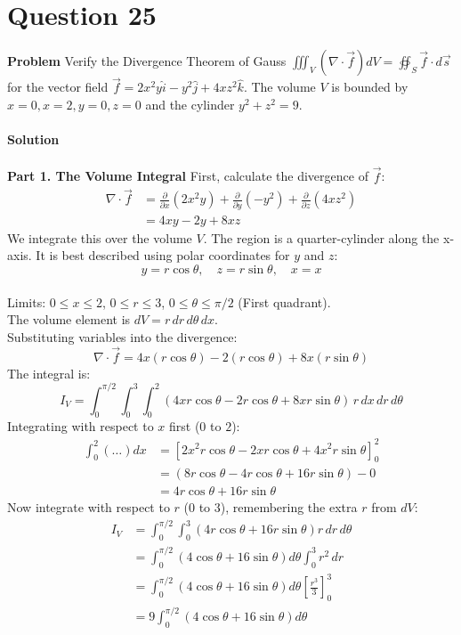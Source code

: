 \documentclass{article}
\begin{document}
\section{Question 25}
\textbf{Problem}
Verify the Divergence Theorem of Gauss
$\iiint_V (\nabla \cdot \vec{f}) dV = \oiint_S \vec{f} \cdot d\vec{s}$ for the
vector field $\vec{f} = 2x^2y\hat{i} - y^2\hat{j} + 4xz^2\hat{k}$. The volume
$V$ is bounded by $x=0, x=2, y=0, z=0$ and the cylinder $y^2+z^2=9$.
\\
\\
\textbf{Solution}
\\
\\
\textbf{Part 1. The Volume Integral}
First, calculate the divergence of $\vec{f}$:
\begin{align*}
	\nabla \cdot \vec{f} & = \frac{\partial}{\partial x}(2x^2y) + \frac{\partial}{\partial y}(-y^2) + \frac{\partial}{\partial z}(4xz^2) \\
	                     & = 4xy - 2y + 8xz
\end{align*}
We integrate this over the volume $V$. The region is a quarter-cylinder along
the x-axis. It is best described using polar coordinates for $y$ and $z$:
\[
	y = r\cos\theta, \quad z = r\sin\theta, \quad x = x
\]
\\
Limits: $0 \le x \le 2$, $0 \le r \le 3$, $0 \le \theta \le \pi/2$ (First quadrant).
\\
The volume element is $dV = r \, dr \, d\theta \, dx$.
\\
Substituting variables into the divergence:
\[
	\nabla \cdot \vec{f} = 4x(r\cos\theta) - 2(r\cos\theta) + 8x(r\sin\theta)
\]
The integral is:
\[
	I_V = \int_0^{\pi/2} \int_0^3 \int_0^2 (4xr\cos\theta - 2r\cos\theta + 8xr\sin\theta) \, r \, dx \, dr \, d\theta
\]
Integrating with respect to $x$ first ($0$ to $2$):
\begin{align*}
	\int_0^2 (\dots) dx & = \left[ 2x^2 r \cos\theta - 2xr \cos\theta + 4x^2 r \sin\theta \right]_0^2 \\
	                    & = (8r\cos\theta - 4r\cos\theta + 16r\sin\theta) - 0                         \\
	                    & = 4r\cos\theta + 16r\sin\theta
\end{align*}
Now integrate with respect to $r$ ($0$ to $3$), remembering the extra $r$ from
$dV$:
\begin{align*}
	I_V & = \int_0^{\pi/2} \int_0^3 (4r\cos\theta + 16r\sin\theta) r \, dr \, d\theta            \\
	    & = \int_0^{\pi/2} (4\cos\theta + 16\sin\theta) d\theta \int_0^3 r^2 \, dr               \\
	    & = \int_0^{\pi/2} (4\cos\theta + 16\sin\theta) d\theta \left[ \frac{r^3}{3} \right]_0^3 \\
	    & = 9 \int_0^{\pi/2} (4\cos\theta + 16\sin\theta) d\theta
\end{align*}
\end{document}
